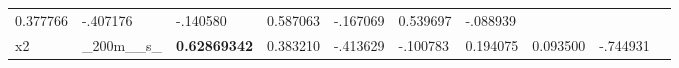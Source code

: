 \documentclass[11pt]{article}
\begin{document}
\begin{longtable}[]{@{}llllllllll@{}}
\begin{minipage}[t]{0.07\columnwidth}
0.377766\strut
\end{minipage} & \begin{minipage}[t]{0.07\columnwidth}\raggedright
-.407176\strut
\end{minipage} & \begin{minipage}[t]{0.07\columnwidth}\raggedright
-.140580\strut
\end{minipage} & \begin{minipage}[t]{0.07\columnwidth}\raggedright
0.587063\strut
\end{minipage} & \begin{minipage}[t]{0.07\columnwidth}\raggedright
-.167069\strut
\end{minipage} & \begin{minipage}[t]{0.07\columnwidth}\raggedright
0.539697\strut
\end{minipage} & \begin{minipage}[t]{0.07\columnwidth}\raggedright
-.088939\strut
\end{minipage}\tabularnewline
\begin{minipage}[t]{0.07\columnwidth}\raggedright
x2\strut
\end{minipage} & \begin{minipage}[t]{0.07\columnwidth}\raggedright
\_200m\_\_s\_\strut
\end{minipage} & \begin{minipage}[t]{0.07\columnwidth}\raggedright
\textbf{0.62869342}\strut
\end{minipage} & \begin{minipage}[t]{0.07\columnwidth}\raggedright
0.383210\strut
\end{minipage} & \begin{minipage}[t]{0.07\columnwidth}\raggedright
-.413629\strut
\end{minipage} & \begin{minipage}[t]{0.07\columnwidth}\raggedright
-.100783\strut
\end{minipage} & \begin{minipage}[t]{0.07\columnwidth}\raggedright
0.194075\strut
\end{minipage} & \begin{minipage}[t]{0.07\columnwidth}\raggedright
0.093500\strut
\end{minipage} & \begin{minipage}[t]{0.07\columnwidth}\raggedright
-.744931\strut
\end{minipage} & \begin{minipage}[t]{0.07\columnwidth}\raggedright

\end{minipage}
\end{longtable}
\end{document}
